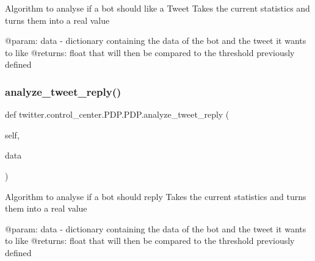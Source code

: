 \begin{DoxyVerb}Algorithm to analyse if a bot should like a Tweet
Takes the current statistics and turns them into a real value

@param: data - dictionary containing the data of the bot and the tweet it wants to like
@returns: float that will then be compared to the threshold previously defined
\end{DoxyVerb}
 \mbox{\label{classtwitter_1_1control__center_1_1PDP_1_1PDP_acbac2033b2853b89b3ee19ed040586e8}} 
\subsubsection{\texorpdfstring{analyze\+\_\+tweet\+\_\+reply()}{analyze\_tweet\_reply()}}
{\footnotesize\ttfamily def twitter.\+control\+\_\+center.\+P\+D\+P.\+P\+D\+P.\+analyze\+\_\+tweet\+\_\+reply (\begin{DoxyParamCaption}\item[{}]{self,  }\item[{}]{data }\end{DoxyParamCaption})}

\begin{DoxyVerb}Algorithm to analyse if a bot should reply
Takes the current statistics and turns them into a real value

@param: data - dictionary containing the data of the bot and the tweet it wants to like
@returns: float that will then be compared to the threshold previously defined
\end{DoxyVerb}
 \mbox{\label{classtwitter_1_1control__center_1_1PDP_1_1PDP_ae173efc2c97b103ad0fbb0484c27835a}} 
